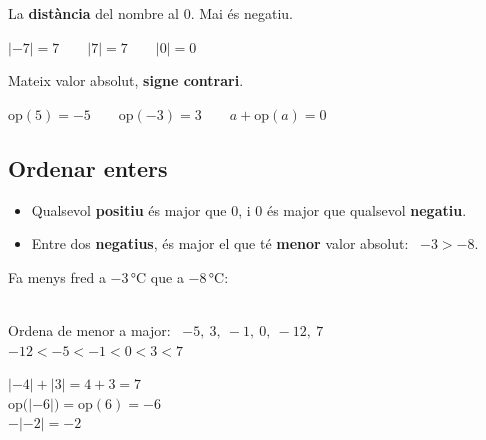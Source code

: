 \documentclass[11pt,a4paper]{article}
\begin{document}
\begin{tcbraster}[raster columns=2,raster equal height,raster column skip=10pt]
\begin{tcolorbox}[fmbase,colback=fmdefbg,colframe=fmdef,coltitle=white,title={Valor absolut \ $|a|$}]
La \textbf{distància} del nombre al 0. Mai és negatiu.\par\smallskip
{\centering$|-7|=7\qquad |7|=7\qquad |0|=0$\par}
\end{tcolorbox}
\begin{tcolorbox}[fmbase,colback=fmdefbg,colframe=fmdef,coltitle=white,title={Oposat \ $\text{op}(a)=-a$}]
Mateix valor absolut, \textbf{signe contrari}.\par\smallskip
{\centering$\text{op}(5)=-5\qquad \text{op}(-3)=3\qquad a+\text{op}(a)=0$\par}
\end{tcolorbox}
\end{tcbraster}

\subsection{Ordenar enters}
\begin{minipage}[t]{0.52\linewidth}
\begin{idea}
\begin{itemize}[leftmargin=1em]
\item Qualsevol \textbf{positiu} és major que 0, i 0 és major que qualsevol \textbf{negatiu}.
\item Entre dos \textbf{negatius}, és major el que té \textbf{menor} valor absolut: \ $-3>-8$.
\end{itemize}
\end{idea}
\end{minipage}\hfill
\begin{minipage}[t]{0.45\linewidth}
\begin{truc}
Fa menys fred a $-3$\,°C que a $-8$\,°C:\\[3pt]
\hspace*{1em}{\Large$-3>-8$} \ \ {\color{fmA}\Large\faThermometerQuarter}
\end{truc}
\end{minipage}

\begin{exemple}[Exemples]
\begin{minipage}[t]{0.5\linewidth}
Ordena de menor a major: \ $-5,\ 3,\ -1,\ 0,\ -12,\ 7$\\[4pt]
{\large$-12<-5<-1<0<3<7$}
\end{minipage}\hfill
\begin{minipage}[t]{0.47\linewidth}
$|-4|+|3|=4+3=7$\\[3pt]
$\text{op}\big(|-6|\big)=\text{op}(6)=-6$\\[3pt]
$-|-2|=-2$
\end{minipage}
\end{exemple}
\end{document}
